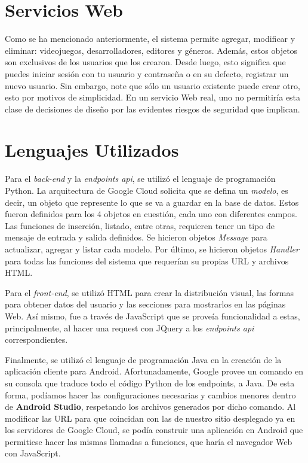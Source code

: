 \documentclass[12pt]{article}
\begin{document}
\section{Servicios Web} 
Como se ha mencionado anteriormente, el sistema permite agregar, modificar y eliminar: videojuegos, desarrolladores, editores y géneros. Además, estos objetos son exclusivos de los usuarios que los crearon. Desde luego, esto significa que puedes iniciar sesión con tu usuario y contraseña o en su defecto, registrar un nuevo usuario. Sin embargo, note que sólo un usuario existente puede crear otro, esto por motivos de simplicidad. En un servicio Web real, uno no permitiría esta clase de decisiones de diseño por las evidentes riesgos de seguridad que implican.

\section{Lenguajes Utilizados}
Para el \textit{back-end} y la \textit{endpoints api}, se utilizó el lenguaje de programación Python. La arquitectura de Google Cloud solicita que se defina un \textit{modelo}, es decir, un objeto que represente lo que se va a guardar en la base de datos. Estos fueron definidos para los 4 objetos en cuestión, cada uno con diferentes campos. Las funciones de inserción, listado, entre otras, requieren tener un tipo de mensaje de entrada y salida definidos. Se hicieron objetos \textit{Message} para actualizar, agregar y listar cada modelo. Por último, se hicieron objetos \textit{Handler} para todas las funciones del sistema que requerían su propias URL y archivos HTML.

Para el \textit{front-end}, se utilizó HTML para crear la distribución visual, las formas para obtener datos del usuario y las secciones para mostrarlos en las páginas Web. Así mismo, fue a través de JavaScript que se proveía funcionalidad a estas, principalmente, al hacer una request con JQuery a los \textit{endpoints api} correspondientes.

Finalmente, se utilizó el lenguaje de programación Java en la creación de la aplicación cliente para Android. Afortunadamente, Google provee un comando en su consola que traduce todo el código Python de los endpoints, a Java. De esta forma, podíamos hacer las configuraciones necesarias y cambios menores dentro de \textbf{Android Studio}, respetando los archivos generados por dicho comando. Al modificar las URL para que coincidan con las de nuestro sitio desplegado ya en los servidores de Google Cloud, se podía construir una aplicación en Android que permitiese hacer las mismas llamadas a funciones, que haría el navegador Web con JavaScript. 
\end{document}
